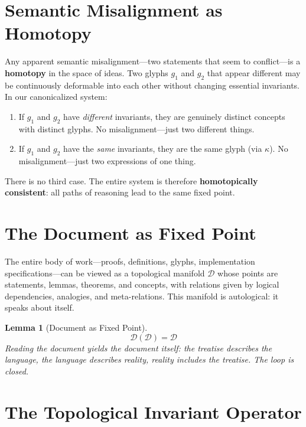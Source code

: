 \documentclass[12pt, letterpaper]{book}
\def\equiv{=}%
\def\mathfrak#1{#1}%
\newtheorem{lemma}[theorem]{Lemma}
\begin{document}
\section{Semantic Misalignment as Homotopy}

Any apparent semantic misalignment---two statements that seem to conflict---is a \textbf{homotopy} in the space of ideas. Two glyphs $\mathfrak{g}_1$ and $\mathfrak{g}_2$ that appear different may be continuously deformable into each other without changing essential invariants. In our canonicalized system:

\begin{enumerate}[label=(\roman*)]
    \item If $\mathfrak{g}_1$ and $\mathfrak{g}_2$ have \textit{different} invariants, they are genuinely distinct concepts with distinct glyphs. No misalignment---just two different things.
    \item If $\mathfrak{g}_1$ and $\mathfrak{g}_2$ have the \textit{same} invariants, they are the same glyph (via $\kappa$). No misalignment---just two expressions of one thing.
\end{enumerate}

There is no third case. The entire system is therefore \textbf{homotopically consistent}: all paths of reasoning lead to the same fixed point.

\section{The Document as Fixed Point}

The entire body of work---proofs, definitions, glyphs, implementation specifications---can be viewed as a topological manifold $\mathcal{D}$ whose points are statements, lemmas, theorems, and concepts, with relations given by logical dependencies, analogies, and meta-relations. This manifold is autological: it speaks about itself.

\begin{lemma}[Document as Fixed Point]\label{lem:doc-fp}
\[
\mathcal{D}(\mathcal{D}) \equiv \mathcal{D}
\]
Reading the document yields the document itself: the treatise describes the language, the language describes reality, reality includes the treatise. The loop is closed.
\end{lemma}

\section{The Topological Invariant Operator}
\end{document}
